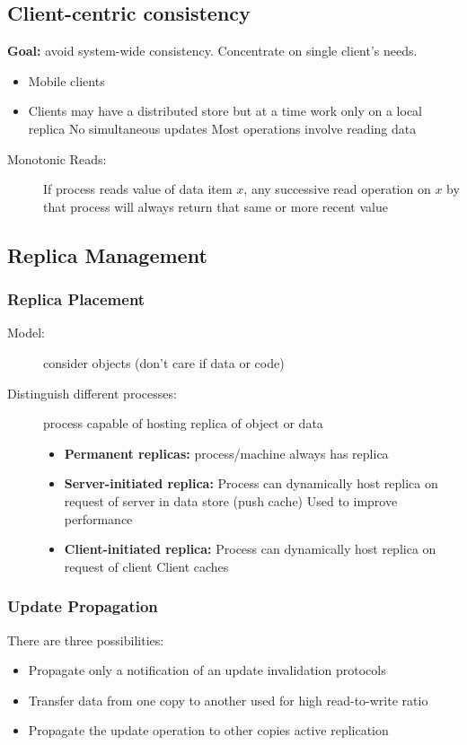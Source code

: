 \subsection{Client-centric consistency}
\textbf{Goal:} avoid system-wide consistency. Concentrate on single client's needs.
\begin{itemize}
	\item Mobile clients
	\item Clients may have a distributed store but at a time work only on a local replica
	\subitem No simultaneous updates
	\subitem Most operations involve reading data
\end{itemize}
\begin{description}
	\item[Monotonic Reads:] If process reads value of data item $x$, any successive read operation on $x$ by that process will always return that same or more recent value
\end{description}

\subsection{Replica Management}
\subsubsection{Replica Placement}
\begin{description}
	\item[Model:] consider objects (don't care if data or code)
	\item[Distinguish different processes:] process capable of hosting replica of object or data
	\begin{itemize}
		\item\textbf{Permanent replicas:} process/machine always has replica
		\item\textbf{Server-initiated replica:} Process can dynamically host replica on request of server in data store (push cache)
		\subitem Used to improve performance
		\item\textbf{Client-initiated replica:} Process can dynamically host replica on request of client
		\subitem Client caches	
	\end{itemize}
\end{description}

\subsubsection{Update Propagation}
There are three possibilities:
\begin{itemize}
	\item Propagate only a notification of an update
	\subitem invalidation protocols
	\item Transfer data from one copy to another
	\subitem used for high read-to-write ratio
	\item Propagate the update operation to other copies
	\subitem active replication	
\end{itemize}

